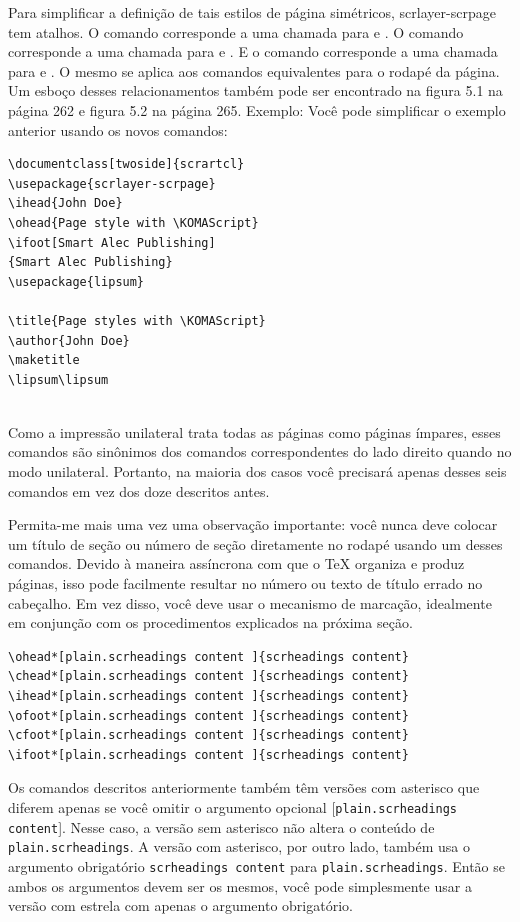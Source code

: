 Para simplificar a definição de tais estilos de página simétricos, scrlayer-scrpage tem atalhos. O comando  corresponde a uma chamada para  e . O comando  corresponde a uma chamada para  e . E o comando  corresponde a uma chamada para  e . O mesmo se aplica aos comandos equivalentes para o rodapé da página. Um esboço desses relacionamentos também pode ser encontrado na figura 5.1 na página 262 e figura 5.2 na página 265.
Exemplo: Você pode simplificar o exemplo anterior usando os novos comandos:
\begin{verbatim}
\documentclass[twoside]{scrartcl}
\usepackage{scrlayer-scrpage}
\ihead{John Doe}
\ohead{Page style with \KOMAScript}
\ifoot[Smart Alec Publishing]
{Smart Alec Publishing}
\usepackage{lipsum}

\title{Page styles with \KOMAScript}
\author{John Doe}
\maketitle
\lipsum\lipsum
    
\end{verbatim}

Como a impressão unilateral trata todas as páginas como páginas ímpares, esses comandos são sinônimos dos comandos correspondentes do lado direito quando no modo unilateral. Portanto, na maioria dos casos você precisará apenas desses seis comandos em vez dos doze descritos antes.

Permita-me mais uma vez uma observação importante: você nunca deve colocar um título de seção ou número de seção diretamente no rodapé usando um desses comandos. Devido à maneira assíncrona com que o TeX organiza e produz páginas, isso pode facilmente resultar no número ou texto de título errado no cabeçalho. Em vez disso, você deve usar o mecanismo de marcação, idealmente em conjunção com os procedimentos explicados na próxima seção.
\begin{verbatim}
\ohead*[plain.scrheadings content ]{scrheadings content}
\chead*[plain.scrheadings content ]{scrheadings content}
\ihead*[plain.scrheadings content ]{scrheadings content}
\ofoot*[plain.scrheadings content ]{scrheadings content}
\cfoot*[plain.scrheadings content ]{scrheadings content}
\ifoot*[plain.scrheadings content ]{scrheadings content}
\end{verbatim}

Os comandos descritos anteriormente também têm versões com asterisco que diferem apenas se você omitir o argumento opcional [\texttt{plain.scrheadings content}]. Nesse caso, a versão sem asterisco não altera o conteúdo de \texttt{plain.scrheadings}. A versão com asterisco, por outro lado, também usa o argumento obrigatório \texttt{scrheadings content} para \texttt{plain.scrheadings}. Então se ambos os argumentos devem ser os mesmos, você pode simplesmente usar a versão com estrela com apenas o argumento obrigatório.

